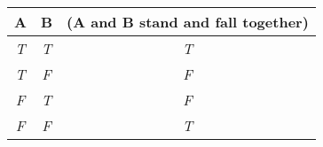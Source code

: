 
\begin{center}
\begin{tabular}{c c||c}
A  & B & (A and B stand and fall together)\\
\hline
\emph{T} & \emph{T} & \emph{T} \\
\emph{T} & \emph{F} & \emph{F}  \\
\emph{F} & \emph{T} & \emph{F} \\
\emph{F} & \emph{F} & \emph{T} \\
\end{tabular}
\end{center}

